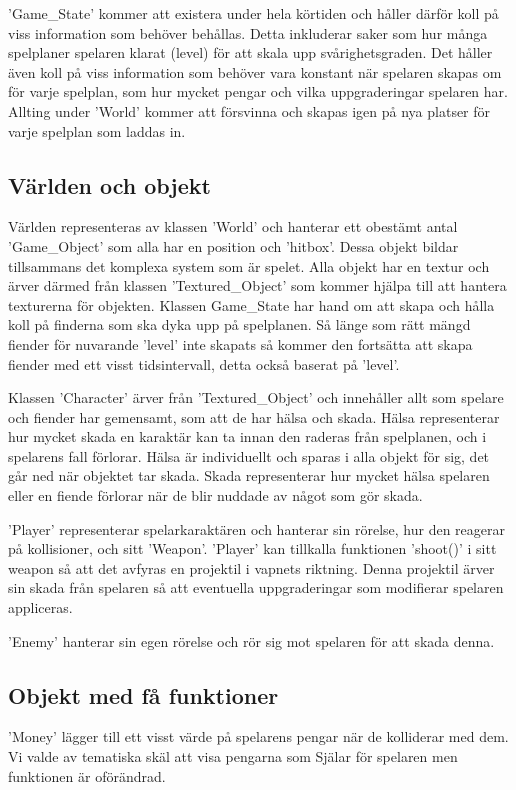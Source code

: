 \documentclass{TDP005mall}
\begin{document}
'Game\_State' kommer att existera under hela körtiden och håller därför koll på viss information som behöver behållas. Detta inkluderar saker som hur många spelplaner spelaren klarat (level) för att skala upp svårighetsgraden. Det håller även koll på viss information som behöver vara konstant när spelaren skapas om för varje spelplan, som hur mycket pengar och vilka uppgraderingar spelaren har. Allting under 'World' kommer att försvinna och skapas igen på nya platser för varje spelplan som laddas in.

\subsection{Världen och objekt}
Världen representeras av klassen 'World' och hanterar ett obestämt antal 'Game\_Object' som alla har en position och 'hitbox'. Dessa objekt bildar tillsammans det komplexa system som är spelet. Alla objekt har en textur och ärver därmed från klassen 'Textured\_Object' som kommer hjälpa till att hantera texturerna för objekten. Klassen Game\_State har hand om att skapa och hålla koll på finderna som ska dyka upp på spelplanen. Så länge som rätt mängd fiender för nuvarande 'level' inte skapats så kommer den fortsätta att skapa fiender med ett visst tidsintervall, detta också baserat på 'level'.

Klassen 'Character' ärver från 'Textured\_Object' och innehåller allt som spelare och fiender har gemensamt, som att de har hälsa och skada. Hälsa representerar hur mycket skada en karaktär kan ta innan den raderas från spelplanen, och i spelarens fall förlorar. Hälsa är individuellt och sparas i alla objekt för sig, det går ned när objektet tar skada. Skada representerar hur mycket hälsa spelaren eller en fiende förlorar när de blir nuddade av något som gör skada.

'Player' representerar spelarkaraktären och hanterar sin rörelse, hur den reagerar på kollisioner, och sitt 'Weapon'. 'Player' kan tillkalla funktionen 'shoot()' i sitt weapon så att det avfyras en projektil i vapnets riktning. Denna projektil ärver sin skada från spelaren så att eventuella uppgraderingar som modifierar spelaren appliceras.

'Enemy' hanterar sin egen rörelse och rör sig mot spelaren för att skada denna.

\subsection{Objekt med få funktioner}
'Money' lägger till ett visst värde på spelarens pengar när de kolliderar med dem. Vi valde av tematiska skäl att visa pengarna som Själar för spelaren men funktionen är oförändrad. 
\end{document}

